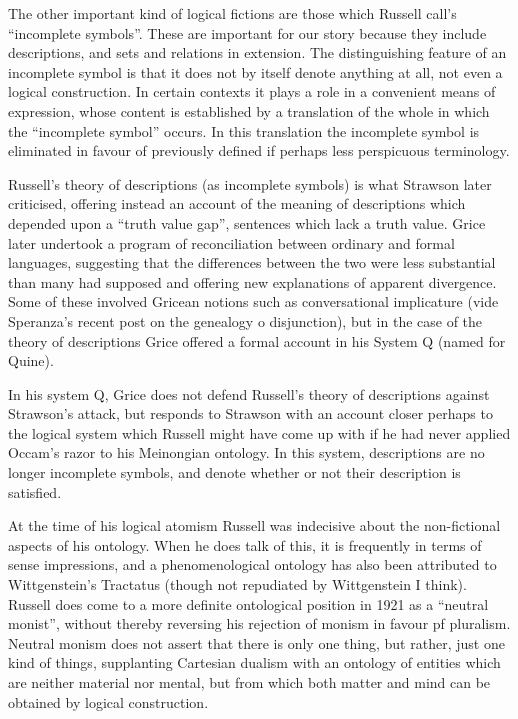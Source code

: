 \documentclass[10pt,titlepage]{article}
\begin{document}
The other important kind of logical fictions are those which Russell call's ``incomplete symbols''.
These are important for our story because they include descriptions, and sets and relations in extension.
The distinguishing feature of an incomplete symbol is that it does not by itself denote anything at all, not even a logical construction.
In certain contexts it plays a role in a convenient means of expression, whose content is established by a translation of the whole in which the ``incomplete symbol'' occurs.
In this translation the incomplete symbol is eliminated in favour of previously defined if perhaps less perspicuous terminology.

Russell's theory of descriptions (as incomplete symbols) is what Strawson later criticised, offering instead an account of the meaning of descriptions which depended upon a ``truth value gap'', sentences which lack a truth value.
Grice later undertook a program of reconciliation between ordinary and formal languages, suggesting that the differences between the two were less substantial than many had supposed and offering new explanations of apparent divergence.
Some of these involved Gricean notions such as conversational implicature (vide Speranza's recent post on the genealogy o  disjunction), but in the case of the theory of descriptions Grice offered a formal account in his System Q (named for Quine).

In his system Q, Grice does not defend Russell's theory of descriptions against Strawson's attack, but responds to Strawson with an account closer perhaps to the logical system which Russell might have come up with if he had never applied Occam's razor to his Meinongian ontology.
In this system, descriptions are no longer incomplete symbols, and denote whether or not their description is satisfied.

At the time of his logical atomism Russell was indecisive about the non-fictional aspects of his ontology.
When he does talk of this, it is frequently in terms of sense impressions, and a phenomenological ontology has also been attributed to Wittgenstein's Tractatus (though not repudiated by Wittgenstein I think).
Russell does come to a more definite ontological position in 1921 as a ``neutral monist'', without thereby reversing his rejection of monism in favour pf pluralism.
Neutral monism does not assert that there is only one thing, but rather, just one kind of things, supplanting Cartesian dualism with an ontology of entities which are neither material nor mental, but from which both matter and mind can be obtained by logical construction.
\end{document}
